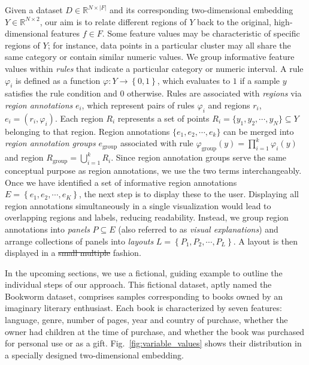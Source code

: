 \documentclass[lettersize,journal]{IEEEtran}
\makeatletter
\providecommand{\DIFadd}[1]{{\protect\color{blue}\uwave{#1}}} %
\providecommand{\DIFdel}[1]{{\protect\color{red}\sout{#1}}} %
\providecommand{\DIFaddbegin}{} %
\providecommand{\DIFaddend}{} %
\providecommand{\DIFdelbegin}{} %
\providecommand{\DIFdelend}{} %
\providecommand{\DIFscaledelfig}{0.5}
\newlength{\DIFdelgraphicswidth} %
\newlength{\DIFdelgraphicsheight} %
\providecommand{\DIFaddincludegraphics}[2][]{{\color{blue}\fbox{\DIFOincludegraphics[#1]{#2}}}} %
\providecommand{\DIFdelincludegraphics}[2][]{%
\sbox{\DIFdelgraphicsbox}{\DIFOincludegraphics[#1]{#2}}%
\settoboxwidth{\DIFdelgraphicswidth}{\DIFdelgraphicsbox} %
\settoboxtotalheight{\DIFdelgraphicsheight}{\DIFdelgraphicsbox} %
\scalebox{\DIFscaledelfig}{%
\parbox[b]{\DIFdelgraphicswidth}{\usebox{\DIFdelgraphicsbox}\\[-\baselineskip] \rule{\DIFdelgraphicswidth}{0em}}\llap{\resizebox{\DIFdelgraphicswidth}{\DIFdelgraphicsheight}{%
\setlength{\unitlength}{\DIFdelgraphicswidth}%
\begin{picture}(1,1)%
\thicklines\linethickness{2pt} %
{\color[rgb]{1,0,0}\put(0,0){\framebox(1,1){}}}%
{\color[rgb]{1,0,0}\put(0,0){\line( 1,1){1}}}%
{\color[rgb]{1,0,0}\put(0,1){\line(1,-1){1}}}%
\end{picture}%
}\hspace*{3pt}}} %
} %
\DeclareRobustCommand{\DIFaddbegin}{\DIFOaddbegin \let\includegraphics\DIFaddincludegraphics} %
\DeclareRobustCommand{\DIFaddend}{\DIFOaddend \let\includegraphics\DIFOincludegraphics} %
\DeclareRobustCommand{\DIFdelbegin}{\DIFOdelbegin \let\includegraphics\DIFdelincludegraphics} %
\DeclareRobustCommand{\DIFdelend}{\DIFOaddend \let\includegraphics\DIFOincludegraphics} %
\let\sout@orig\sout %
\renewcommand{\sout}[1]{\ifmmode\text{\sout@orig{\ensuremath{#1}}}\else\sout@orig{#1}\fi} %
\makeatother
\begin{document}
Given a dataset $D \in \mathbb{R}^{N \times |F|}$ and its corresponding two-dimensional embedding $Y \in \mathbb{R}^{N \times 2}$, our aim is to relate different regions of $Y$ back to the original, high-dimensional features $f \in F$.
Some feature values may be characteristic of specific regions of $Y$; for instance, data points in a particular cluster may all share the same category or contain similar numeric values.
We group informative feature values within \textit{rules} that indicate a particular category or numeric interval.
A rule $\varphi_i$ is defined as a function $\varphi: Y \rightarrow \left \{ 0, 1
\right \} $, which evaluates to $1$ if a sample $y$ satisfies the rule condition and $0$ otherwise.
Rules are associated with \textit{regions} via \textit{region annotations} $e_i$, which represent pairs of rules $\varphi_i$ and regions $r_i$, $e_i = \left ( r_i, \varphi_i \right )$.
Each region $R_i$ represents a set of points $R_i = \{ y_1, y_2, \cdots, y_N \} \subseteq Y$ belonging to that region.
Region annotations $\{ e_1, e_2, \cdots, e_k \}$ can be merged into \textit{region annotation groups} $e_{\text{group}}$ associated with rule $\varphi_{\text{group}}(y) = \prod_{i=1}^k \varphi_i(y)$ and region $R_{\text{group}} = \bigcup_{i=1}^{k} R_i$. Since region annotation groups serve the same conceptual purpose as region annotations, we use the two terms interchangeably.
Once we have identified a set of informative region annotations $E = \left \{ e_1, e_2, \cdots, e_K \right \}$, the next step is to display these to the user. Displaying all region annotations simultaneously in a single visualization would lead to overlapping regions and labels, reducing readability.
Instead, we group region annotations into \textit{panels} $P \subseteq E$ (also referred to as \textit{visual explanations}) and arrange collections of panels into \textit{layouts} $L = \left \{ P_1, P_2, \cdots, P_L \right \}$. A layout is then displayed in a \DIFdelbegin \DIFdel{small multiple }\DIFdelend \DIFaddbegin \DIFadd{small-multiple }\DIFaddend fashion.

In the upcoming sections, we use a fictional, guiding example to outline the individual steps of our approach.
This fictional dataset, aptly named the Bookworm dataset, comprises samples corresponding to books owned by an imaginary literary enthusiast. Each book is characterized by seven features: language, genre, number of pages, year and country of purchase, whether the owner had children at the time of purchase, and whether the book was purchased for personal use or as a gift.
Fig.~\ref{fig:variable_values} shows their distribution in a specially designed two-dimensional embedding.
\end{document}
